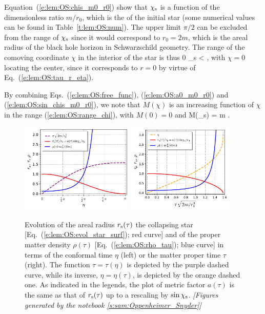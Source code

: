 Equation~(\ref{e:lem:OS:chis_m0_r0}) show that
$\chi_{\rm s}$ is a function of the dimensionless ratio $m/r_0$, which is the
 of the initial star
(some numerical values can be found in Table~\ref{t:lem:OS:num}).
The upper limit $\pi/2$ can be excluded from the range of
$\chi_{\rm s}$ since it
would correspond to $r_0 = 2 m$, which is the areal radius of the black hole
horizon in Schwarzschild geometry. The range of the comoving coordinate $\chi$
in the interior of the star is thus
\be \label{e:lem:OS:range_chi}
    0 \leq \chi \leq \chi_{\rm s} <  ,
\ee
with $\chi=0$ locating the center, since it corresponds to $r=0$ by
virtue of Eq.~(\ref{e:lem:OS:tau_r_eta}).

By combining Eqs.~(\ref{e:lem:OS:free_func}), (\ref{e:lem:OS:a0_m0_r0}) and
(\ref{e:lem:OS:sin_chis_m0_r0}), we note that $M(\chi)$ is an increasing function
of $\chi$ in the range (\ref{e:lem:OS:range_chi}), with $M(0) = 0$ and
\be
    M(\chi_{\rm s}) = m .
\ee


\begin{figure}
\centerline{
\includegraphics[width=0.48\textwidth]{lem_OS_rs_rho_eta.pdf}\quad
\includegraphics[width=0.45\textwidth]{lem_OS_rs_rho_tau.pdf}
}
\caption[]{\label{f:lem:OS:rs_tho} \footnotesize
Evolution of the areal radius $r_{\rm s}(\tau)$ the collapsing star [Eq.~(\ref{e:lem:OS:evol_star_surf}); red curve] and of the proper matter density
$\rho(\tau)$ [Eq.~(\ref{e:lem:OS:rho_tau}); blue curve] in terms of the conformal time $\eta$ (left)
or the matter proper time $\tau$ (right).  The function $\tau = \tau(\eta)$ is depicted by the purple dashed curve, while its inverse, $\eta = \eta(\tau)$, is depicted by the orange dashed one.
As indicated in the legends, the plot of metric
factor $a(\tau)$ is the same as that of $r_{\rm s}(\tau)$ up to a rescaling
by $\sin\chi_{\rm s}$.
\textsl{[Figures generated by the notebook \ref{s:sam:Oppenheimer_Snyder}]}
}
\end{figure}


